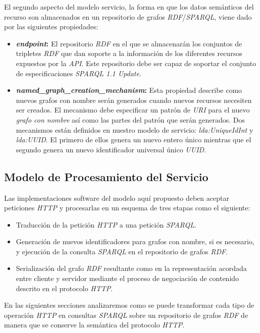 El segundo aspecto del modelo servicio, la forma en que los datos sem\'anticos del recurso son almacenados en un repositorio de grafos \textit{RDF}/\textit{SPARQL}, viene dado por las siguientes propiedades:

\begin{itemize}
\item \textbf{\textit{endpoint}:} El repositorio \textit{RDF} en el que se almacenar\'an los conjuntos de tripletes \textit{RDF} que dan soporte a la informaci\'on de los diferentes recursos expuestos por la \textit{API}. Este repositorio debe ser capaz de soportar el conjunto de especificaciones \textit{SPARQL 1.1 Update}.
\item \textbf{\textit{named\_graph\_creation\_mechanism}:} Esta propiedad describe como nuevos grafos con nombre ser\'an generados cuando nuevos recursos necesiten ser creados. El mecanismo debe especificar un patr\'on de \textit{URI} para el nuevo \textit{grafo con nombre} as\'i como las partes del patr\'on que ser\'an generados. Dos mecanismos est\'an definidos en nuestro modelo de servicio: \textit{lda:UniqueIdInt} y \textit{lda:UUID}. El primero de ellos genera un nuevo entero \'unico mientras que el segundo genera un nuevo identificador universal \'unico \textit{UUID}.
\end{itemize}

\subsection{Modelo de Procesamiento del Servicio}

Las implementaciones software del modelo aqu\'i propuesto deben aceptar peticiones \textit{HTTP} y procesarlas en un esquema de tres etapas como el siguiente:\

\begin{itemize}
\item Traducci\'on de la petici\'on \textit{HTTP} a una petici\'on \textit{SPARQL}.
\item Generaci\'on de nuevos identificadores para grafos con nombre, si es necesario, y ejecuci\'on de la consulta \textit{SPARQL} en el repositorio de grafos \textit{RDF}.
\item Serializaci\'on del grafo \textit{RDF} resultante como en la representaci\'on acordada entre cliente y servidor mediante el proceso de negociaci\'on de contenido descrito en el protocolo \textit{HTTP}.
\end{itemize}

En las siguientes secciones analizaremos como se puede transformar cada tipo de operaci\'on \textit{HTTP} en consultas \textit{SPARQL} sobre un repositorio de grafos \textit{RDF} de manera que se conserve la sem\'antica del protocolo \textit{HTTP}.

